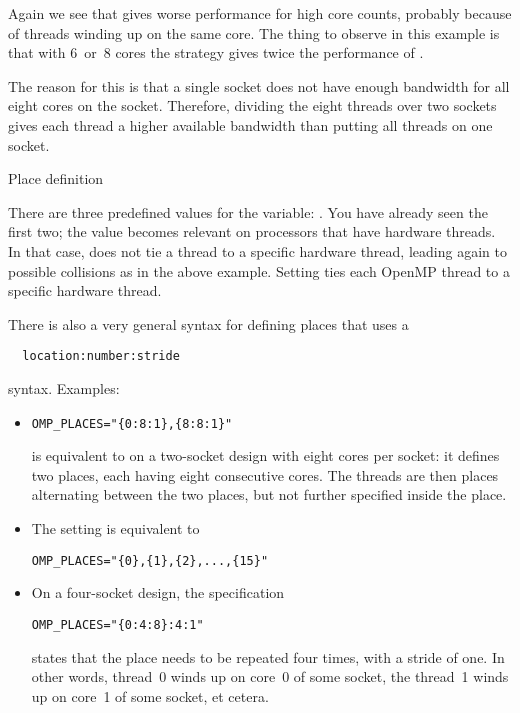 Again we see that  gives worse performance for
high core counts,
probably because of threads winding up on the same core.
The thing to observe in this example is that with 6~or~8 cores the
 strategy gives twice the performance of
.

The reason for this is that a single socket
does not have enough bandwidth for all eight cores on the
socket. Therefore, dividing the eight threads over two sockets gives
each thread a higher available bandwidth than putting all threads on
one socket.

 {Place definition}

There are three predefined values for the 
variable: . You have already seen the first
two; the  value becomes relevant on processors that have
hardware threads. In that case,  does not tie a
thread to a specific hardware thread, leading again to possible
collisions as in the above example. Setting 
ties each OpenMP thread to a specific hardware thread.

There is also a very general syntax for defining places that uses a
\begin{verbatim}
  location:number:stride
\end{verbatim}
syntax. Examples:
\begin{itemize}
\item
\begin{verbatim}
OMP_PLACES="{0:8:1},{8:8:1}"
\end{verbatim}
  is equivalent to
   on a two-socket design with eight cores per socket: it
  defines two places, each having eight consecutive cores. The threads
  are then places alternating between the two places, but not further
  specified inside the place.
\item The setting  is equivalent to
\begin{verbatim}
OMP_PLACES="{0},{1},{2},...,{15}"
\end{verbatim}
\item On a four-socket design, the specification
\begin{verbatim}
OMP_PLACES="{0:4:8}:4:1"
\end{verbatim}
  states that the place  needs to be repeated four times,
  with a stride of one. In other words,  thread~0 winds up on
  core~0 of some socket, the thread~1 winds up on core~1 of some
  socket, et cetera.
\end{itemize}

